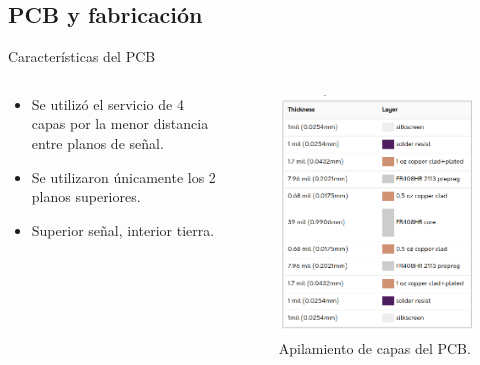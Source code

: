 \documentclass{beamer}
\begin{document}
\subsection{PCB y fabricación}

\begin{frame}{Características del PCB}

    \begin{columns}[c]
        \begin{block}{}
            \begin{itemize}
                \item Se utilizó el servicio de 4 capas por la menor distancia
                    entre planos de señal.
                \item Se utilizaron únicamente los 2 planos superiores.
                \item Superior señal, interior tierra.
            \end{itemize}
        \end{block}
        \begin{figure}[t]
            \centering
            \includegraphics[width=\textwidth]{images/oshpark_stackup.png}
            \caption{Apilamiento de capas del PCB.}
        \end{figure}
    \end{columns}
\end{frame}
\end{document}
